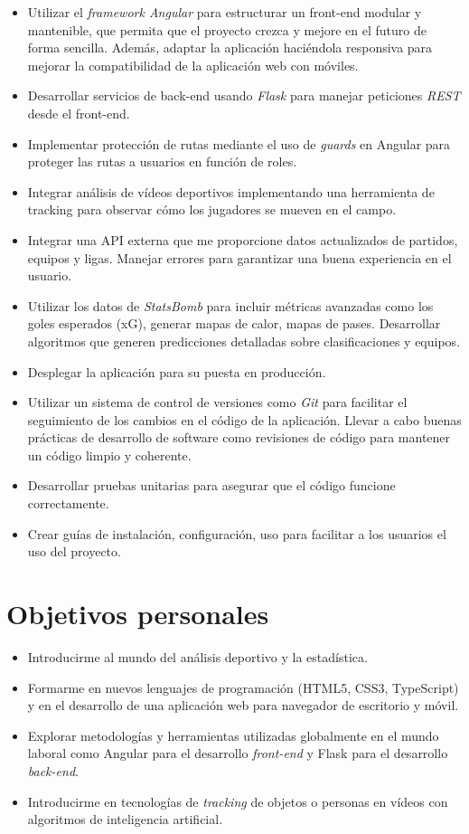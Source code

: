 \begin{itemize}
    \item Utilizar el \textit{framework Angular} para estructurar un front-end modular y mantenible, que permita que el proyecto crezca y mejore en el futuro de forma sencilla. Además, adaptar la aplicación haciéndola responsiva para mejorar la compatibilidad de la aplicación web con móviles.
    \item Desarrollar servicios de back-end usando \textit{Flask} para manejar peticiones \textit{REST} desde el front-end.
     \item Implementar protección de rutas mediante el uso de \textit{guards} en Angular para proteger las rutas a usuarios en función de roles.
    \item Integrar análisis de vídeos deportivos implementando una herramienta de tracking para observar cómo los jugadores se mueven en el campo.
    \item Integrar una API externa que me proporcione datos actualizados de partidos, equipos y ligas. Manejar errores para garantizar una buena experiencia en el usuario.
    \item  Utilizar los datos de \textit{StatsBomb} para incluir métricas avanzadas como los goles esperados (xG), generar mapas de calor, mapas de pases. Desarrollar algoritmos que generen predicciones detalladas sobre clasificaciones y equipos.
    \item Desplegar la aplicación para su puesta en producción.
    \item Utilizar un sistema de control de versiones como \textit{Git} para facilitar el seguimiento de los cambios en el código de la aplicación. Llevar a cabo buenas prácticas de desarrollo de software como revisiones de código para mantener un código limpio y coherente.
    \item Desarrollar pruebas unitarias para asegurar que el código funcione correctamente.
    \item Crear guías de instalación, configuración, uso para facilitar a los usuarios el uso del proyecto.
    
\end{itemize}

\section{Objetivos personales}
\begin{itemize}
    \item Introducirme al mundo del análisis deportivo y la estadística.
    \item Formarme en nuevos lenguajes de programación (HTML5, CSS3, TypeScript) y en el desarrollo de una aplicación web para navegador de escritorio y móvil.
    \item Explorar metodologías y herramientas utilizadas globalmente en el mundo laboral como Angular para el desarrollo \textit{front-end} y Flask para el desarrollo \textit{back-end}.
    \item Introducirme en tecnologías de \textit{tracking} de objetos o personas en vídeos con algoritmos de inteligencia artificial.
\end{itemize}
